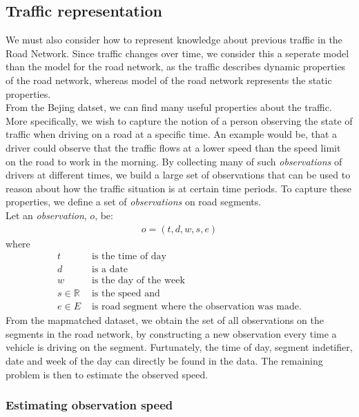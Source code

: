 \subsection{Traffic representation}\label{KR:traffic}
We must also consider how to represent knowledge about previous traffic in the Road Network. Since traffic changes over time, we consider this a seperate model than the model for the road network, as the traffic describes dynamic properties of the road network, whereas model of the road network represents the static properties.\\
From the Bejing datset, we can find many useful properties about the traffic. More specifically, we wish to capture the notion of a person observing the state of traffic when driving on a road at a specific time. An example would be, that a driver could observe that the traffic flows at a lower speed than the speed limit on the road to work in the morning. By collecting many of such \emph{observations} of drivers at different times, we build a large set of observations that can be used to reason about how the traffic situation is at certain time periods. To capture these properties, we define a set of \emph{observations} on road segments.\\
Let an \emph{observation}, $o$, be:
\begin{align*}
o = (t, d, w, s, e)
\end{align*}
where 
\begin{align*}
t &\text{ is the time of day} \\
d &\text{ is a date} \\
w &\text{ is the day of the week} \\
s \in \mathbb{R} &\text{ is the speed and}\\
e \in E &\text{ is road segment where the observation was made.}
\end{align*}
From the mapmatched dataset, we obtain the set of all observations on the segments in the road network, by constructing a new observation every time a vehicle is driving on the segment. Furtunately, the time of day, segment indetifier, date and week of the day can directly be found in the data. The remaining problem is then to estimate the observed speed.

\subsubsection{Estimating observation speed}\label{KR:speed}
